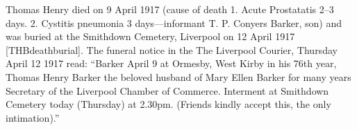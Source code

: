 Thomas Henry died on 9 April 1917\cite{THBdeathcert} (cause of death 1. Acute Prostatatis 2--3 days. 2. Cystitis pneumonia 3 days---informant T. P. Conyers Barker, son) and was buried at the Smithdown Cemetery, Liverpool on 12 April 1917 [THBdeathburial]. The funeral notice in the The Liverpool Courier, Thursday April 12 1917 read:
``Barker April 9 at Ormesby, West Kirby in his 76th year, Thomas Henry Barker the beloved husband of Mary Ellen Barker for many years Secretary of the Liverpool Chamber of Commerce. Interment at Smithdown Cemetery today (Thursday) at 2.30pm. (Friends kindly accept this, the only intimation).''
